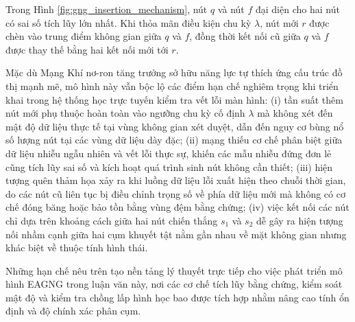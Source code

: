 Trong Hình \ref{fig:gng_insertion_mechanism}, nút $q$ và nút $f$ đại diện cho hai nút có sai số tích lũy lớn nhất. Khi thỏa mãn điều kiện chu kỳ $\lambda$, nút mới $r$ được chèn vào trung điểm không gian giữa $q$ và $f$, đồng thời kết nối cũ giữa $q$ và $f$ được thay thế bằng hai kết nối mới tới $r$.

Mặc dù Mạng Khí nơ-ron tăng trưởng sở hữu năng lực tự thích ứng cấu trúc đồ thị mạnh mẽ, mô hình này vẫn bộc lộ các điểm hạn chế nghiêm trọng khi triển khai trong hệ thống học trực tuyến kiểm tra vết lỗi màn hình:
(i) tần suất thêm nút mới phụ thuộc hoàn toàn vào ngưỡng chu kỳ cố định $\lambda$ mà không xét đến mật độ dữ liệu thực tế tại vùng không gian xét duyệt, dẫn đến nguy cơ bùng nổ số lượng nút tại các vùng dữ liệu dày đặc;
(ii) mạng thiếu cơ chế phân biệt giữa dữ liệu nhiễu ngẫu nhiên và vết lỗi thực sự, khiến các mẫu nhiễu đứng đơn lẻ cũng tích lũy sai số và kích hoạt quá trình sinh nút không cần thiết;
(iii) hiện tượng quên thảm họa xảy ra khi luồng dữ liệu lỗi xuất hiện theo chuỗi thời gian, do các nút cũ liên tục bị điều chỉnh trọng số về phía dữ liệu mới mà không có cơ chế đóng băng hoặc bảo tồn bằng vùng đệm bằng chứng;
(iv) việc kết nối các nút chỉ dựa trên khoảng cách giữa hai nút chiến thắng $s_1$ và $s_2$ dễ gây ra hiện tượng nối nhầm cạnh giữa hai cụm khuyết tật nằm gần nhau về mặt không gian nhưng khác biệt về thuộc tính hình thái.

Những hạn chế nêu trên tạo nền tảng lý thuyết trực tiếp cho việc phát triển mô hình EAGNG trong luận văn này, nơi các cơ chế tích lũy bằng chứng, kiểm soát mật độ và kiểm tra chồng lấp hình học bao được tích hợp nhằm nâng cao tính ổn định và độ chính xác phân cụm.